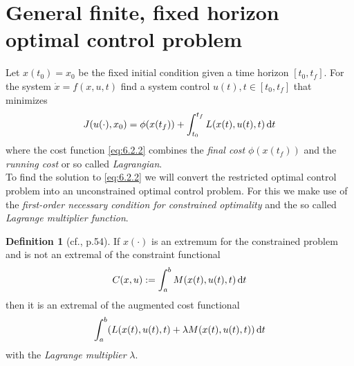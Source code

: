 \documentclass[paper=a4, pagesize, DIV=calc, BCOR=12.5mm, twoside=on, onecolumn=on, open = any, titlepage =on, parskip =half-, headsepline = on, footsepline = on, chapterprefix = on, appendixprefix = off, fontsize = 12pt, numbers = noenddot, abstract = on]{scrbook}
\numberwithin{equation}{chapter}
\theoremstyle{definition}
\newtheorem{definition}{Definition}
\theoremstyle{plain}
\theoremstyle{plain}
\theoremstyle{remark}
\theoremstyle{plain}
\theoremstyle{plain}
\begin{document}
\section{General finite, fixed horizon optimal control problem} 
\label{sec:GFOCP}
\onehalfspacing
Let $x(t_0) = x_0$ be the fixed initial condition given a time horizon $\left[ t_0, t_f\right]$. For the system $\dot{x} = f(x, u, t)$ find a system control $u(t), t \in \left[ t_0, t_f\right]$ that minimizes
\begin{equation}
J(u(\cdot),x_0) = \phi(x(t_f)) + \int_{t_0}^{t_f} L(x(t), u(t), t) \mathop{}\!\mathrm{d} t \label{eq:6.2.2}
\end{equation}
where the cost function \eqref{eq:6.2.2} combines the \emph{ final cost} $\phi(x(t_f))$ and the \emph{running cost} or so called \emph{Lagrangian}.\\
To find the solution to \eqref{eq:6.2.2} we will convert the restricted optimal control problem into an unconstrained optimal control problem. For this we make use of the \emph{first-order necessary condition for constrained optimality} and the so called \emph{Lagrange multiplier function}.
\begin{definition}[cf.\cite{lib:2012}, p.54]
If $x(\cdot)$ is an extremum for the constrained problem and is not an extremal of the constraint functional \[C(x, u) := \int_a^b M(x(t), u(t), t) \mathop{}\!\mathrm{d} t \] then it is an extremal of the augmented cost functional \[ \int_a^b (L(x(t), u(t), t) + \lambda M(x(t), u(t), t)) \mathop{}\!\mathrm{d} t\] with the \emph{Lagrange multiplier} $\lambda $.
\end{definition}
\end{document}

